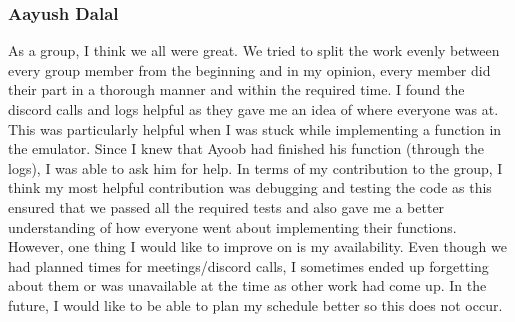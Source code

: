 \documentclass[10pt]{article}
\begin{document}
\subsubsection{Aayush Dalal}
As a group, I think we all were great. We tried to split the work evenly between every group member from the beginning and in my opinion, every member did their part in a thorough manner and within the required time. I found the discord calls and logs helpful as they gave me an idea of where everyone was at. This was particularly helpful when I was stuck while implementing a function in the emulator. Since I knew that Ayoob had finished his function (through the logs), I was able to ask him for help. In terms of my contribution to the group, I think my most helpful contribution was debugging and testing the code as this ensured that we passed all the required tests and also gave me a better understanding of how everyone went about implementing their functions. However, one thing I would like to improve on is my availability. Even though we had planned times for meetings/discord calls, I sometimes ended up forgetting about them or was unavailable at the time as other work had come up. In the future, I would like to be able to plan my schedule better so this does not occur.
\end{document}
